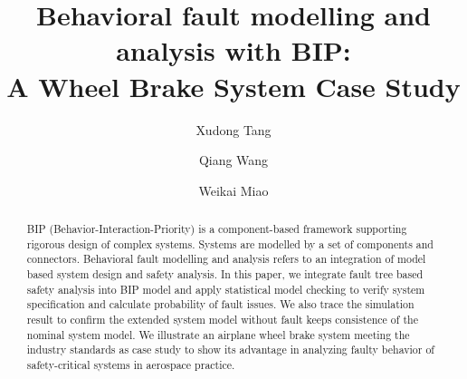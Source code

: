 \documentclass[runningheads]{llncs}
\begin{document}
%
\title{Behavioral fault modelling and analysis with BIP:\\
	A Wheel Brake System Case Study\\}
%
%
\author{Xudong Tang \and
Qiang Wang \and
Weikai Miao}
%
%
%
\maketitle              %
%
\begin{abstract}
BIP (Behavior-Interaction-Priority) is a component-based framework supporting rigorous design of complex systems.
Systems are modelled by a set of components and connectors.
Behavioral fault modelling and analysis refers to an integration of model based system design and safety analysis.
In this paper, we integrate fault tree based safety analysis into BIP model and
apply statistical model checking to verify system specification and calculate probability of fault issues.
We also trace the simulation result to confirm the extended system model without fault keeps consistence of the nominal system model.
We illustrate an airplane wheel brake system meeting the industry standards as case study
to show its advantage in analyzing faulty behavior of safety-critical systems in aerospace practice.

\end{abstract}
%
%
%











\end{document}

